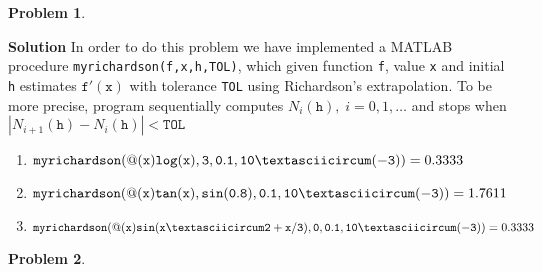 \documentclass[8pt]{article} %
\newtheorem{prob}{Problem}
\newenvironment{solution}%
{\par\textbf{Solution}\space }%
{\par}
\begin{document}
\begin{prob}\end{prob}
\begin{solution}
	In order to do this problem we have implemented a MATLAB procedure \texttt{myrichardson(f,x,h,TOL)}, which given function \texttt{f},
	value \texttt{x} and initial \texttt{h} estimates $\mathtt{f}'(\mathtt{x})$ with tolerance
	\texttt{TOL} using Richardson's extrapolation. To be more precise,
	program sequentially computes $N_i(\mathtt{h}),\;i=0,1,\dots$ and stops when $|N_{i+1}(\mathtt{h})-N_i(\mathtt{h})|<\mathtt{TOL}$\\
	\begin{enumerate}[label=(\alph*)]
		\item{$\mathtt{myrichardson(@(x)log(x),3,0.1,10\textasciicircum(-3))}=0.3333$
			}
		\item{$\mathtt{myrichardson(@(x)tan(x),sin(0.8),0.1,10\textasciicircum(-3))}=1.7611$
			}
		\item{$\mathtt{myrichardson(@(x)sin(x\textasciicircum2+x/3),0,0.1,10\textasciicircum(-3))}=0.3333$
			}
	\end{enumerate}
\end{solution}
\begin{prob}\end{prob}
\end{document}
